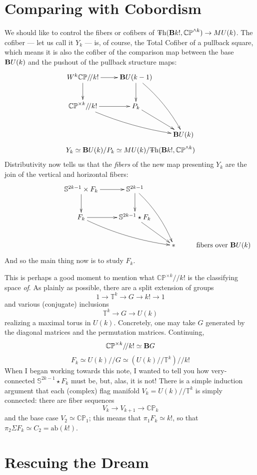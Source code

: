 \documentclass{article}
\newcommand{\CP}{\mathbb{CP}}
\newcommand{\sph}{\mathbb{S}}
\newcommand{\6}{\partial}
\newcommand{\8}{\infty}
\newcommand{\bq}{/\!/}
\newcommand{\smsh}{\wedge}
\begin{document}
\section{Comparing with Cobordism}
\label{compar}
We should like to control the fibers or cofibers of $\Th(\deloop k!,\CP^{\smsh k}) \to MU(k)$.  The cofiber --- let us call it $Y_k$ --- is, of course, the Total Cofiber of a pullback square, which means it is also the cofiber of the comparison map between the base $\mathbf{B} U(k)$ and the pushout of the pullback structure maps:
$$\begin{xy}\xymatrix{
W^k\CP \bq k! \ar[r] \ar[d] & \deloop U(k-1) \ar[d] \ar@/^/[ddr] \\
\CP^{\times k} \bq k! \ar[r] \ar@/_/[drr] & P_k \ar[dr] \\
& & \deloop U(k) }\end{xy} $$
$$ Y_k \simeq \deloop U(k) / P_k \simeq MU(k) / \Th(\deloop k!,\CP^{\smsh k} ) $$
Distributivity now tells us that the {\em fibers} of the new map presenting $Y_k$ are the join of the vertical and horizontal fibers:
$$ \begin{xy}\xymatrix{
\sph^{2k-1} \times F_k \ar[r] \ar[d] & \sph^{2k-1} \ar[d] \ar@/^/[ddr] \\
F_k \ar[r] \ar@/_/[drr] & \sph^{2k-1} \star F_k \ar[dr] \\
& & {*} & \rlap{$\mbox{fibers over }\deloop U(k)$}
} \end{xy} $$
And so the main thing now is to study $F_k$.

This is perhaps a good moment to mention what $\CP^{\times k}\bq k!$ is the classifying space {\em of}.  As plainly as possible, there are a split extension of groups
$$ 1\to \mathbb{T}^k \to G \to k!\to 1 $$ 
and various (conjugate) inclusions
$$ \mathbb{T}^k \to G \to U(k) $$ 
realizing a maximal torus in $U(k)$.  Concretely, one may take $G$ generated by the diagonal matrices and the permutation matrices.  Continuing,
$$ \CP^{\times k}\bq k! \simeq \deloop G $$
$$ F_k \simeq U(k) \bq G \simeq (U(k) \bq \mathbb{T}^k)\bq k! $$
When I began working towards this note, I wanted to tell you how very-connected $\sph^{2k-1}\star F_k$ must be, but, alas, it is not!  There is a simple induction argument that each (complex) flag manifold $V_k = U(k)\bq \mathbb{T}^k$ is simply connected: there are fiber sequences
$$ V_k \to V_{k+1} \to \CP_k $$
and the base case $V_2 \simeq \CP_1$; this means that $\pi_1 F_k \simeq k!$, so that $\pi_2 \Sigma F_k \simeq C_2 = \mathrm{ab}(k!) $.

\section{Rescuing the Dream}\label{rescue}
\end{document}
